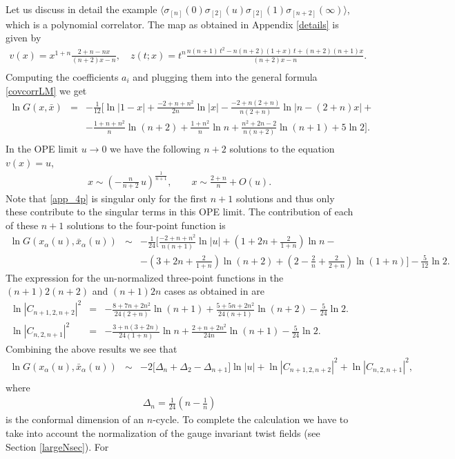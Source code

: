 \documentclass[letterpaper]{JHEP3}
\def\a{\alpha}
\def\be{\begin{equation}}
\def\ee{\end{equation}}
\def\a{\alpha}
\def\be{\begin{eqnarray}}
\def\ee{\end{eqnarray}}
\begin{document}
 Let us discuss in detail the example  $\langle \sigma_{[n]} (0) \sigma_{[2]} (u) \sigma_{[2]} (1) \sigma_{[n+2]}(\infty) \rangle$, which is a polynomial correlator. 
 The map as obtained in Appendix \ref{details} is given by
\be
v(x)=x^{1 + n} \frac{2 + n - n x}{(n+2) x-n },\quad
z(t; x)=t^n \frac%
{n(n+1)\,t^2-n(n+2)(1+x)\,t+(n+2)(n+1)x}{(n+2) x-n}.\nonumber\\
\ee
 Computing the coefficients $a_i$ and plugging them into the general formula \eqref{covcorrLM} we get
\be \label{app_4p}
\ln G(x,\bar x)&=&-\frac{1}{12}\biggl[  \ln|1 - x| + \frac{-2 + n + n^2}{2n} \ln |x|  -
  \frac{-2 + n (2 + n)}{n (2 + n)}  \ln\left|n  - (2+n) x\right|+\nonumber\\
&&- \frac{1+n+n^2}{n} \ln (n+2) +\frac{ 1 + n^2}{n}\ln  n
+\frac{n^2+2n-2}{n(n+2)}\ln (n+1)+5\ln2\biggr].\nonumber\\
\ee In the OPE limit $u\to 0$ we have the following $n+2$ solutions to the equation $v(x)=u$,
\be \label{uxapp}
x\sim \left(-\frac{n}{n+2}\,u\right)^{\frac{1}{n+1}}, \qquad x\sim \frac{2+n}{n}+O(u).
\ee 
Note that \eqref{app_4p} is singular only for the first $n+1$ solutions and thus only these contribute to the
singular terms in this OPE limit. The contribution of each of these $n+1$ solutions to the four-point function is 
\be
\ln G(x_\a(u),\bar x_\a(u))&\sim&-\frac{1}{24}\biggl[ \frac{-2 + n + n^2}{n(n+1)} \ln |u|  +(1 +2 n +\frac{ 2}{1 + n}) \ln n-\\
  &&- (3 + 2 n + \frac{2}{1 + n})\ln (n+2) 
+(2 -\frac{2}{n} +\frac{ 2}{2 + n}) \ln  (1 + n)  \biggr] -\frac{5}{12}\ln 2.\nonumber
\ee
The expression for the un-normalized three-point functions in the  $(n+1)2(n+2)$ and $(n+1)2n$ cases as obtained in \cite{Lunin:2000yv} are 
\be
\ln|C_{n+1,2,n+2}|^2&=&
-\frac{8 + 7 n + 2 n^2}{24 (2 + n)}\ln(n+1)
+\frac{5+5n+2n^2}{24(n+1)}\ln(n+2)-\frac{5}{24}\ln 2.\nonumber\\
\ln|C_{n,2,n+1}|^2&=&
-\frac{3+n (3 +2 n)}{24 (1+n)}\ln n+\frac{2 +  n + 2 n^2}{24 n}\ln(n+1)-\frac{5}{24}\ln 2.
\ee
Combining the above results we see that
\be
\ln G(x_\a(u),\bar x_\a(u))&\sim&-2\biggl[\Delta_n+\Delta_2-\Delta_{n+1}\biggr] \ln |u|+\ln|C_{n+1,2,n+2}|^2+\ln|C_{n,2,n+1}|^2,
\nonumber\\
\ee where \be \Delta_n=\frac{1}{24}\left(n-\frac{1}{n}\right)\ee is the conformal dimension of an $n$-cycle.
To complete the calculation we have to take into account the normalization of the gauge invariant twist fields (see Section \ref{largeNsec}). For
\end{document}
